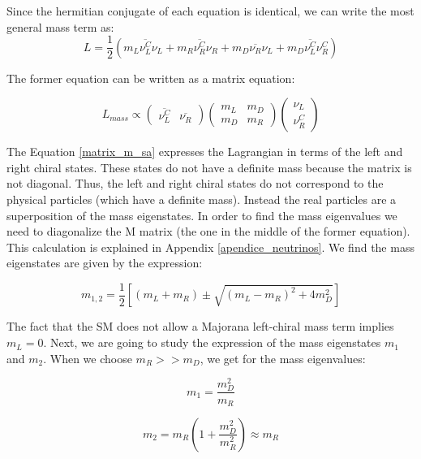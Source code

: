 Since the hermitian conjugate of each equation is identical, we can write the most general mass term as:
\begin{equation}
L = \frac{1}{2} \left( m_L \overline{\nu_L^C} \nu_L + m_R \overline{\nu_R^C} \nu_{R} + m_D \overline{\nu_R}\nu_L + m_D \overline{\nu_L^C}\nu_R^C   \right)
\end{equation}

The former equation can be written as a matrix equation: 

\begin{equation}\label{matrix_m_sa}
L_{mass} \propto
\begin{pmatrix} 
  \overline{\nu_L^C} & \overline{\nu_R}
\end{pmatrix}
\begin{pmatrix}
  m_L & m_D \\
  m_D & m_R  
\end{pmatrix}
\begin{pmatrix}
  \nu_L \\
  \nu_R^C  
\end{pmatrix}
\end{equation}

The Equation \ref{matrix_m_sa} expresses the Lagrangian in terms of the left and right chiral states. These states do not have a definite mass because the matrix is not diagonal. 
Thus, the left and right chiral states do not correspond to the physical particles (which have a definite mass). Instead the real particles are a superposition of the 
mass eigenstates. In order to find the mass eigenvalues we need to diagonalize the M matrix (the one in the middle of the former equation). This calculation is 
explained in Appendix \ref{apendice_neutrinos}. We find the mass eigenstates are given by the expression:

\begin{equation}
m_{1,2} = \frac{1}{2} \left[ (m_L + m_R) \pm \sqrt{(m_L - m_R)^2 + 4m_D^2} \right]
\end{equation}
 
The fact that the SM does not allow a Majorana left-chiral mass term implies $m_L = 0$. Next, we are going to study the expression of the mass eigenstates $m_1$ and $m_2$. 
When we choose $m_R >> m_D$, we get for the mass eigenvalues:

\begin{equation}
m_1 = \frac{m_D^2}{m_R}
\end{equation}

\begin{equation}
m_2 = m_R \left( 1 + \frac{m_D^2}{m_R^2}\right) \approx m_R 
\end{equation}
 
